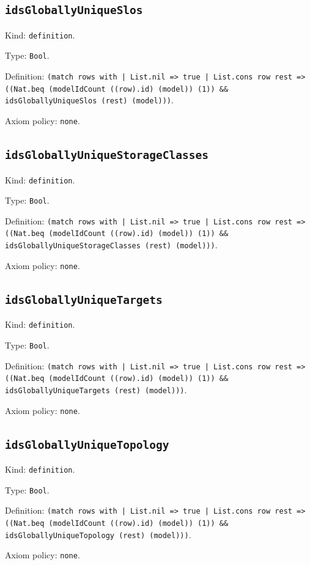 \documentclass[11pt]{article}
\begin{document}
\subsection*{\texttt{idsGloballyUniqueSlos}}
\noindent Kind: \texttt{definition}.\par
\noindent Type: \texttt{Bool}.\par
\noindent Definition: \texttt{(match rows with | List.nil => true | List.cons row rest => ((Nat.beq (modelIdCount ((row).id) (model)) (1)) \&\& idsGloballyUniqueSlos (rest) (model)))}.\par
\noindent Axiom policy: \texttt{none}.\par
\subsection*{\texttt{idsGloballyUniqueStorageClasses}}
\noindent Kind: \texttt{definition}.\par
\noindent Type: \texttt{Bool}.\par
\noindent Definition: \texttt{(match rows with | List.nil => true | List.cons row rest => ((Nat.beq (modelIdCount ((row).id) (model)) (1)) \&\& idsGloballyUniqueStorageClasses (rest) (model)))}.\par
\noindent Axiom policy: \texttt{none}.\par
\subsection*{\texttt{idsGloballyUniqueTargets}}
\noindent Kind: \texttt{definition}.\par
\noindent Type: \texttt{Bool}.\par
\noindent Definition: \texttt{(match rows with | List.nil => true | List.cons row rest => ((Nat.beq (modelIdCount ((row).id) (model)) (1)) \&\& idsGloballyUniqueTargets (rest) (model)))}.\par
\noindent Axiom policy: \texttt{none}.\par
\subsection*{\texttt{idsGloballyUniqueTopology}}
\noindent Kind: \texttt{definition}.\par
\noindent Type: \texttt{Bool}.\par
\noindent Definition: \texttt{(match rows with | List.nil => true | List.cons row rest => ((Nat.beq (modelIdCount ((row).id) (model)) (1)) \&\& idsGloballyUniqueTopology (rest) (model)))}.\par
\noindent Axiom policy: \texttt{none}.\par
\end{document}
